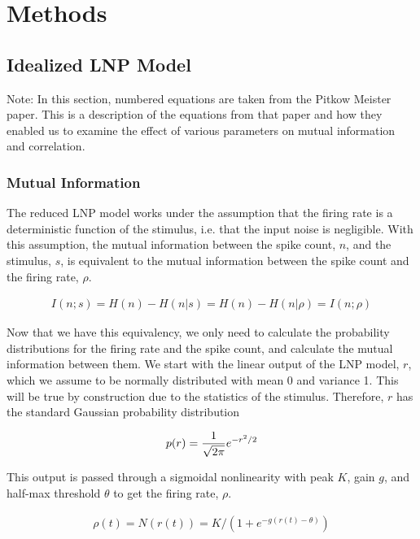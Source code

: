 \documentclass[12pt]{article}
\begin{document}
\section{Methods}

\subsection{Idealized LNP Model}

Note: In this section, numbered equations are taken from the Pitkow Meister paper. This is a description of the equations from that paper and how they enabled us to examine the effect of various parameters on mutual information and correlation.

\subsubsection{Mutual Information}

The reduced LNP model works under the assumption that the firing rate is a deterministic function of the stimulus, i.e. that the input noise is negligible. With this assumption, the mutual information between the spike count, $n$, and the stimulus, $s$, is equivalent to the mutual information between the spike count and the firing rate, $\rho$.

\begin{align}
\displaystyle I(n;s) = H(n)-H(n|s)=H(n)-H(n|\rho)=I(n;\rho) \tag{18}
\end{align}

\noindent Now that we have this equivalency, we only need to calculate the probability distributions for the firing rate and the spike count, and calculate the mutual information between them. We start with the linear output of the LNP model, $r$, which we assume to be normally distributed with mean 0 and variance 1. This will be true by construction due to the statistics of the stimulus. Therefore, $r$ has the standard Gaussian probability distribution

\begin{align}
\displaystyle p(r) = \frac{1}{\sqrt{2\pi}}e^{-r^2/2} \notag
\end{align}

\noindent This output is passed through a sigmoidal nonlinearity with peak $K$, gain $g$, and half-max threshold $\theta$ to get the firing rate, $\rho$.

\begin{align}
\displaystyle \rho(t) = N(r(t)) = K \Big/ \left(1+e^{-g(r(t)-\theta)}\right) \tag{8, 10}
\end{align}
\end{document}
